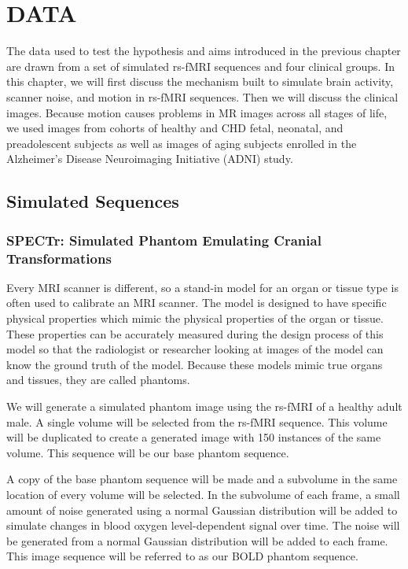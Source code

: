 \chapter{DATA}
\label{ch5:data}

The data used to test the hypothesis and aims introduced in the previous chapter are drawn from a set of simulated rs-fMRI sequences and four clinical groups. In this chapter, we will first discuss the mechanism built to simulate brain activity, scanner noise, and motion in rs-fMRI sequences. Then we will discuss the clinical images. Because motion causes problems in MR images across all stages of life, we used images from cohorts of healthy and CHD fetal, neonatal, and preadolescent subjects as well as images of aging subjects enrolled in the Alzheimer's Disease Neuroimaging Initiative (ADNI) study.

\section{Simulated Sequences}

\subsection{SPECTr: Simulated Phantom Emulating Cranial Transformations}

Every MRI scanner is different, so a stand-in model for an organ or tissue type is often used to calibrate an MRI scanner. The model is designed to have specific physical properties which mimic the physical properties of the organ or tissue. These properties can be accurately measured during the design process of this model so that the radiologist or researcher looking at images of the model can know the ground truth of the model. Because these models mimic true organs and tissues, they are called phantoms. 

We will generate a simulated phantom image using the rs-fMRI of a healthy adult male. A single volume will be selected from the rs-fMRI sequence. This volume will be duplicated to create a generated image with 150 instances of the same volume. This sequence will be our base phantom sequence. 

A copy of the base phantom sequence will be made and a subvolume in the same location of every volume will be selected. In the subvolume of each frame, a small amount of noise generated using a normal Gaussian distribution will be added to simulate changes in blood oxygen level-dependent signal over time. The noise will be generated from a normal Gaussian distribution will be added to each frame. This image sequence will be referred to as our BOLD phantom sequence.

